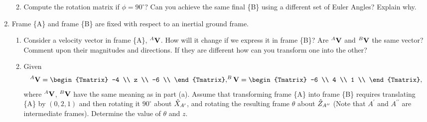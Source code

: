 \begin{enumerate}
\begin{enumerate}[label=(\alph*)]
\vspace{3cm}
  \item
Compute the rotation matrix if $\phi = 90^\circ$? Can you achieve the same final \{B\} using a different set of Euler Angles? Explain why.
\vspace{4cm}
  \end{enumerate}
\vspace{1ex}
  
\newpage
  
\item
Frame \{A\} and frame \{B\} are fixed with respect to an inertial ground frame.

\begin{enumerate}[label=(\alph*)]
  \item Consider a velocity vector in frame \{A\}, $^{A}{\bf V}$. How will it change if
we express it in frame \{B\}? Are $^{A}{\bf V}$ and $^{B}{\bf V}$ the same vector? Comment upon their magnitudes and directions. If they are different how can you transform one into the other?


  \item
Given 
\begin{eqnarray*}
\V{A}{V} = 
  \begin{Tmatrix}
    -4 \\
    z \\
    -6 \\
  \end{Tmatrix}, 
  \V{B}{V} = 
  \begin{Tmatrix}
   -6 \\
    4 \\
    1 \\
  \end{Tmatrix},
\end{eqnarray*}
where $^{A}{\bf V}$, $^{B}{\bf V}$ have the same meaning as in part (a). Assume that transforming frame \{A\} into frame \{B\} requires translating \{A\} by $(0,2,1)$ and then rotating it $90^\circ$ about $\hat{X}_{A^\prime}$, and rotating the resulting frame $\theta$ about $\hat{Z}_{A^{\prime\prime}}$ (Note that $A^{\prime}$ and $A^{\prime\prime}$ are intermediate frames). Determine the value of $\theta$ and $z$.




\end{enumerate}
\vspace{1ex}

\newpage


\end{enumerate}
